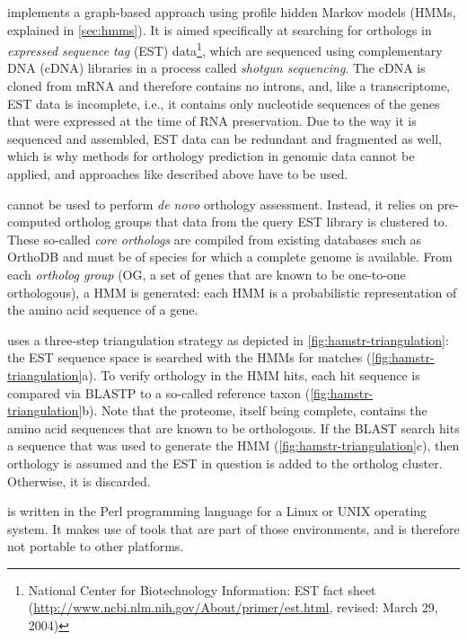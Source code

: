 \hamstr implements a graph-based approach using profile hidden Markov models
(HMMs, explained in \autoref{sec:hmms}). It is aimed specifically at
searching for orthologs in \emph{expressed sequence tag} (EST)
data\footnote{National Center for Biotechnology Information: EST fact sheet
(\url{http://www.ncbi.nlm.nih.gov/About/primer/est.html}, revised: March 29,
2004)}, which are sequenced using complementary DNA (cDNA) libraries in a
process called \emph{shotgun sequencing}. The cDNA is cloned from mRNA and
therefore contains no introns, and, like a transcriptome, EST data is
incomplete, i.e., it contains only nucleotide sequences of the genes that were
expressed at the time of RNA preservation. Due to the way it is sequenced and
assembled, EST data can be redundant and fragmented as well, which is why
methods for orthology prediction in genomic data cannot be applied, and
approaches like described above have to be used.

\hamstr cannot be used to perform \emph{de novo} orthology assessment. Instead,
it relies on pre-computed ortholog groups that data from the query EST library is
clustered to. These so-called \emph{core orthologs} are compiled from existing
databases such as OrthoDB and must be of species for which a complete genome is
available. From each \emph{ortholog group} (OG, a set of genes that are known to
be one-to-one orthologous), a HMM is generated: each HMM is a probabilistic
representation of the amino acid sequence of a gene. 

\hamstr uses a three-step triangulation strategy as depicted in
\autoref{fig:hamstr-triangulation}: the EST sequence space is searched with the
HMMs for matches (\autoref{fig:hamstr-triangulation}a). To verify orthology in
the HMM hits, each hit sequence is compared via BLASTP \citep{altschul1997} to a
so-called reference taxon (\autoref{fig:hamstr-triangulation}b). Note that the
proteome, itself being complete, contains the amino acid sequences that are
known to be orthologous. If the BLAST search hits a sequence that was used to
generate the HMM (\autoref{fig:hamstr-triangulation}c), then orthology is
assumed and the EST in question is added to the ortholog cluster. Otherwise, it
is discarded.



%

\hamstr is written in the Perl programming language for a Linux or UNIX
operating system. It makes use of tools that are part of those environments, and
is therefore not portable to other platforms.
